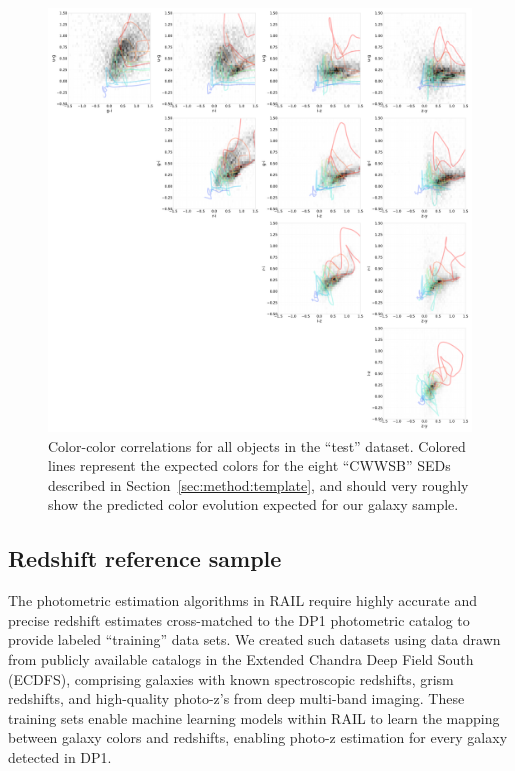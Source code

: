 \begin{figure}
    \centering
    \includegraphics[width=\linewidth]{figures/color_v_color.pdf}
    \caption{Color-color correlations for all objects in the ``test'' dataset.  Colored lines represent the expected colors for the eight ``CWWSB'' SEDs described in Section~\ref{sec:method:template}, and should very roughly show the predicted color evolution expected for our galaxy sample.}
    \label{fig:dp_color_v_color}
\end{figure}

\pagebreak

\subsection{Redshift reference sample}
\label{sec:data:reference}

The photometric estimation algorithms in RAIL require highly accurate and precise redshift estimates cross-matched to the DP1 photometric catalog to provide labeled ``training'' data sets.  We created such datasets using data drawn from publicly available catalogs in the Extended Chandra Deep Field South (ECDFS), comprising galaxies with known spectroscopic redshifts, grism redshifts, and high-quality photo-z's from deep multi-band imaging.  These training sets enable machine learning models within RAIL to learn the mapping between galaxy colors and redshifts, enabling photo-z estimation for every galaxy detected in DP1.

